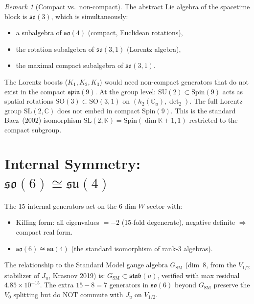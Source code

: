 \documentclass[11pt]{article}
\theoremstyle{definition}
\theoremstyle{remark}
\newtheorem{remark}{Remark}
\begin{document}
\begin{remark}[Compact vs.\ non-compact]
The abstract Lie algebra of the spacetime block is $\mathfrak{so}(3)$,
which is simultaneously:
\begin{itemize}
  \item a subalgebra of $\mathfrak{so}(4)$ (compact, Euclidean rotations),
  \item the rotation subalgebra of $\mathfrak{so}(3,1)$ (Lorentz algebra),
  \item the maximal compact subalgebra of $\mathfrak{so}(3,1)$.
\end{itemize}
The Lorentz boosts ($K_1, K_2, K_3$) would need non-compact generators
that do not exist in the compact $\mathfrak{spin}(9)$.
At the group level: $\mathrm{SU}(2) \subset \mathrm{Spin}(9)$ acts as
spatial rotations $\mathrm{SO}(3) \subset \mathrm{SO}(3,1)$ on
$(h_2(\mathbb{C}_u), \det_2)$.  The full Lorentz group
$\mathrm{SL}(2,\mathbb{C})$ does not embed in compact $\mathrm{Spin}(9)$.
This is the standard Baez~(2002) isomorphism
$\mathrm{SL}(2,\mathbb{K}) = \mathrm{Spin}(\dim\mathbb{K}+1, 1)$
restricted to the compact subgroup.
\end{remark}

\section{Internal Symmetry: $\mathfrak{so}(6) \cong \mathfrak{su}(4)$}

The 15 internal generators act on the 6-dim $W$-sector with:
\begin{itemize}
  \item Killing form: all eigenvalues $= -2$ (15-fold degenerate),
    negative definite $\Rightarrow$ compact real form.
  \item $\mathfrak{so}(6) \cong \mathfrak{su}(4)$
    (the standard isomorphism of rank-3 algebras).
\end{itemize}

The relationship to the Standard Model gauge algebra $G_{\mathrm{SM}}$
(dim~8, from the $V_{1/2}$ stabilizer of $J_u$, Krasnov 2019) is:
$G_{\mathrm{SM}} \subset \mathfrak{stab}(u)$, verified with
max residual $4.85 \times 10^{-15}$.
The extra $15 - 8 = 7$ generators in $\mathfrak{so}(6)$ beyond
$G_{\mathrm{SM}}$ preserve the $V_0$ splitting but do NOT commute
with $J_u$ on $V_{1/2}$.

\end{document}
